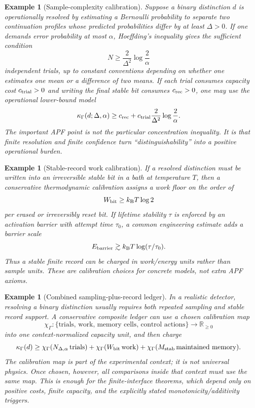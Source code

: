 \documentclass[11pt]{article}
\newtheorem{example}[theorem]{Example}
\newcommand{\R}{\mathbb R}
\begin{document}
\begin{example}[Sample-complexity calibration]\label{ex:kappa-sample-complexity}
Suppose a binary distinction $d$ is operationally resolved by estimating a Bernoulli probability to separate two continuation profiles whose predicted probabilities differ by at least $\Delta>0$.  If one demands error probability at most $\alpha$, Hoeffding's inequality gives the sufficient condition
\[
  N \geq \frac{2}{\Delta^2}\log\frac{2}{\alpha}
\]
independent trials, up to constant conventions depending on whether one estimates one mean or a difference of two means.  If each trial consumes capacity cost $c_{\rm trial}>0$ and writing the final stable bit consumes $c_{\rm rec}>0$, one may use the operational lower-bound model
\[
  \kappa_\Gamma(d;\Delta,\alpha)
  \geq
  c_{\rm rec}+c_{\rm trial}\frac{2}{\Delta^2}\log\frac{2}{\alpha}.
\]
The important APF point is not the particular concentration inequality.  It is that finite resolution and finite confidence turn ``distinguishability'' into a positive operational burden.
\end{example}

\begin{example}[Stable-record work calibration]\label{ex:kappa-landauer-calibration}
If a resolved distinction must be written into an irreversible stable bit in a bath at temperature $T$, then a conservative thermodynamic calibration assigns a work floor on the order of
\[
  W_{\rm bit}\geq k_{\rm B}T\log 2
\]
per erased or irreversibly reset bit.  If lifetime stability $\tau$ is enforced by an activation barrier with attempt time $\tau_0$, a common engineering estimate adds a barrier scale
\[
  E_{\rm barrier}\gtrsim k_{\rm B}T\log(\tau/\tau_0).
\]
Thus a stable finite record can be charged in work/energy units rather than sample units.  These are calibration choices for concrete models, not extra APF axioms.
\end{example}


\begin{example}[Combined sampling-plus-record ledger]\label{ex:combined-kappa-ledger}
In a realistic detector, resolving a binary distinction usually requires both repeated sampling and stable record support.  A conservative composite ledger can use a chosen calibration map
\[
  \chi_\Gamma:\{\text{trials, work, memory cells, control actions}\}\to\R_{\ge0}
\]
into one context-normalized capacity unit, and then charge
\[
  \kappa_\Gamma(d)
  \ge
  \chi_\Gamma(N_{\Delta,\alpha}\,\text{trials})
  +\chi_\Gamma(W_{\rm bit}\,\text{work})
  +\chi_\Gamma(M_{\rm stab}\,\text{maintained memory}) .
\]
The calibration map is part of the experimental context; it is not universal physics.  Once chosen, however, all comparisons inside that context must use the same map.  This is enough for the finite-interface theorems, which depend only on positive costs, finite capacity, and the explicitly stated monotonicity/additivity triggers.
\end{example}
\end{document}
